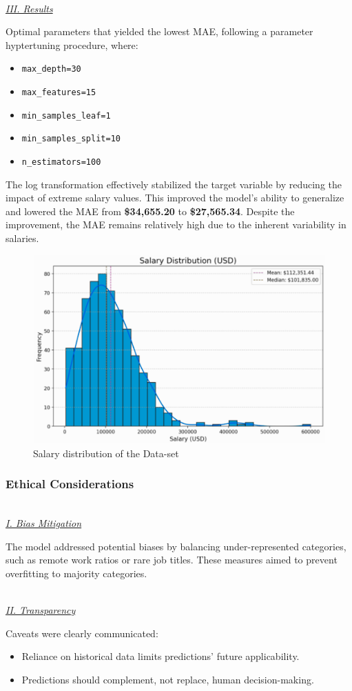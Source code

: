 \documentclass[11pt,a4paper]{article}
\newcommand{\subsubsubsection}[1]{
  {\setlength\itemindent{13pt} \textit{\uline{\\#1\\}}} 
}
\begin{document}
\subsubsubsection{III. Results}
Optimal parameters that yielded the lowest MAE, following a parameter hyptertuning procedure, where:
\begin{itemize}
\item \texttt{max\_depth=30}
\item \texttt{max\_features=15}
\item \texttt{min\_samples\_leaf=1}
\item \texttt{min\_samples\_split=10}
\item \texttt{n\_estimators=100}
\end{itemize}
The log transformation effectively stabilized the target variable by reducing the impact of extreme salary values. This improved the model's ability to generalize and lowered the MAE from \textbf{\$34,655.20} to \textbf{\$27,565.34}. Despite the improvement, the MAE remains relatively high due to the inherent variability in salaries.
\begin{figure}
    \centering
    \includegraphics[width=1\linewidth]{ICS-5110_salary_distrobution.png}
    \caption{Salary distribution of the Data-set}
    \label{fig:Salary distribution of the Data-set}
\end{figure}

\subsubsection{Ethical Considerations}
\subsubsubsection{I. Bias Mitigation}
The model addressed potential biases by balancing under-represented categories, such as remote work ratios or rare job titles. These measures aimed to prevent overfitting to majority categories.
\subsubsubsection{II. Transparency}
Caveats were clearly communicated:
\begin{itemize}
\item Reliance on historical data limits predictions’ future applicability.
\item Predictions should complement, not replace, human decision-making.
\end{itemize}
\end{document}
